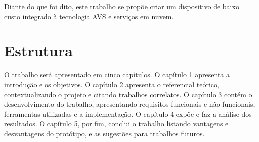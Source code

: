Diante do que foi dito, este trabalho se propõe criar um dispositivo de baixo custo integrado à tecnologia AVS e serviços em nuvem.

\section{Estrutura}
O trabalho será apresentado em cinco capítulos. O capítulo 1 apresenta a introdução e os objetivos. O capítulo 2 apresenta o referencial teórico, contextualizando o projeto e citando trabalhos correlatos. O capítulo 3 contém o desenvolvimento do trabalho, apresentando requisitos funcionais e não-funcionais, ferramentas utilizadas e a implementação. O capítulo 4 expõe e faz a análise dos resultados. O capítulo 5, por fim, conclui o trabalho listando vantagens e desvantagens do protótipo, e as sugestões para trabalhos futuros.
